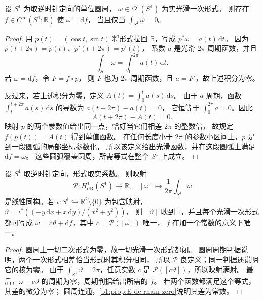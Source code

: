\begin{proposition}[圆周上的周期判据]\label{b1:prop:E-circle-period}
设 \(S^1\) 为取逆时针定向的单位圆周，
\(\omega\in\Omega^1(S^1)\) 为实光滑一次形式。
则存在 \(f\in C^\infty(S^1;\mathbb R)\) 使 \(\omega=\mathrm df\)，
当且仅当 \(\int_{S^1}\omega=0\)。
\end{proposition}
\begin{proof}
用 \(p(t)=(\cos t,\sin t)\) 将形式拉回 \(\mathbb R\)，写成
\(p^*\omega=a(t)\,\mathrm dt\)。
因为 \(p(t+2\pi)=p(t)\)、\(p'(t+2\pi)=p'(t)\)，
系数 \(a\) 是光滑 \(2\pi\) 周期函数，并且
\[
 \int_{S^1}\omega=\int_0^{2\pi}a(t)\,\mathrm dt.
\]
若 \(\omega=\mathrm df\)，令 \(F=f\circ p\)，
则 \(F\) 也为 \(2\pi\) 周期函数，且 \(a=F'\)，故上述积分为零。

反过来，若上述积分为零，定义
\(A(t)=\int_0^t a(s)\,\mathrm ds\)。
由于 \(a\) 周期，函数 \(\int_t^{t+2\pi}a(s)\,\mathrm ds\)
的导数为 \(a(t+2\pi)-a(t)=0\)，
它恒等于 \(\int_0^{2\pi}a=0\)。因此
\[
 A(t+2\pi)-A(t)=0.
\]
映射 \(p\) 的两个参数值给出同一点，恰好当它们相差 \(2\pi\) 的整数倍，
故规定 \(f(p(t))=A(t)\) 得到单值函数。
在任何长度小于 \(2\pi\) 的参数小区间上，\(p\) 是到一段圆弧的局部坐标参数化，
所以该定义给出光滑函数，并在这段圆弧上满足 \(\mathrm df=\omega\)。
这些圆弧覆盖圆周，所需等式在整个 \(S^1\) 上成立。
\end{proof}

\begin{proposition}\label{b1:prop:E-de-rham-circle}
设 \(S^1\) 取逆时针定向，形式取实系数。
则映射
\[
 \mathcal P:H_{\mathrm{dR}}^1(S^1)\longrightarrow\mathbb R,
 \quad [\omega]\longmapsto\frac{1}{2\pi}\int_{S^1}\omega
\]
是线性同构。若
\(\iota:S^1\hookrightarrow\mathbb R^2\setminus\{0\}\) 为包含映射，
\(\vartheta=\iota^*((-y\,\mathrm dx+x\,\mathrm dy)/(x^2+y^2))\)，
则 \([\vartheta]\) 映到 \(1\)，并且每个光滑一次形式都可写成
\(\omega=c\vartheta+\mathrm df\)，其中 \(c=\mathcal P([\omega])\) 唯一，
\(f\) 在加一个常数的意义下唯一。
\end{proposition}
\begin{proof}
圆周上一切二次形式为零，故一切光滑一次形式都闭。
圆周周期判据说明，两个一次形式相差恰当形式时其积分相同，
所以 \(\mathcal P\) 良定义；同一判据还说明它的核为零。
由于 \(\int_{S^1}\vartheta=2\pi\)，任意实数 \(c\) 是
\(\mathcal P([c\vartheta])\)，所以映射满射。
最后，\(\omega-c\vartheta\) 的周期为零，周期判据给出所需的 \(f\)。
若两个函数都满足这个等式，其差的微分为零；
圆周连通，\cref{b1:prop:E-de-rham-zero}说明其差为常数。
\end{proof}

